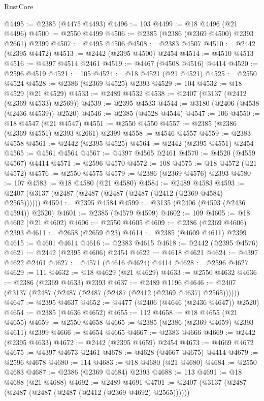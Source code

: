 \begin{lexlean}{RustCore}
\begin{coremodule}
@4495 := @2385 (@4475 @4493)
@4496 := 103
@4499 := @18 @4496 (@21 @4496)
@4500 := @2550 @4499
@4506 := @2385 (@2386 (@2369 @4500) @2393 @2661) @2399
@4507 := @4495 @4506
@4508 := @2383 @4507
@4510 := @2442 (@2395 @4472)
@4513 := @2442 (@2395 @4500) @2454
@4514 := @4510 @4513
@4516 := @4397 @4514 @2461
@4519 := @4467 (@4508 @4516) @4414
@4520 := @2596 @4519
@4521 := 105
@4524 := @18 @4521 (@21 @4521)
@4525 := @2550 @4524
@4528 := @2386 (@2369 @4525) @2393
@4529 := 104
@4532 := @18 @4529 (@21 @4529)
@4533 := @2489 @4532
@4538 := @2407 (@3137 (@2412 (@2369 @4533) @2569))
@4539 := @2395 @4533
@4544 := @3180 (@2406 (@4538 (@2436 @4539)) @2520)
@4546 := @2385 (@4528 @4544)
@4547 := 106
@4550 := @18 @4547 (@21 @4547)
@4551 := @2550 @4550
@4557 := @2385 (@2386 (@2369 @4551) @2393 @2661) @2399
@4558 := @4546 @4557
@4559 := @2383 @4558
@4561 := @2442 (@2395 @4525)
@4564 := @2442 (@2395 @4551) @2454
@4565 := @4561 @4564
@4567 := @4397 @4565 @2461
@4570 := @4520 (@4559 @4567) @4414
@4571 := @2596 @4570
@4572 := 108
@4575 := @18 @4572 (@21 @4572)
@4576 := @2550 @4575
@4579 := @2386 (@2369 @4576) @2393
@4580 := 107
@4583 := @18 @4580 (@21 @4580)
@4584 := @2489 @4583
@4593 := @2407 (@3137 (@2487 (@2487 (@2487 (@2487 (@2412 (@2369 @4584) @2565))))))
@4594 := @2395 @4584
@4599 := @3135 (@2406 (@4593 (@2436 @4594)) @2520)
@4601 := @2385 (@4579 @4599)
@4602 := 109
@4605 := @18 @4602 (@21 @4602)
@4606 := @2550 @4605
@4609 := @2386 (@2369 @4606) @2393
@4611 := @2658 (@2659 @23)
@4614 := @2385 (@4609 @4611) @2399
@4615 := @4601 @4614
@4616 := @2383 @4615
@4618 := @2442 (@2395 @4576)
@4621 := @2442 (@2395 @4606) @2454
@4622 := @4618 @4621
@4624 := @4397 @4622 @2461
@4627 := @4571 (@4616 @4624) @4414
@4628 := @2596 @4627
@4629 := 111
@4632 := @18 @4629 (@21 @4629)
@4633 := @2550 @4632
@4636 := @2386 (@2369 @4633) @2393
@4637 := @2489 @1196
@4646 := @2407 (@3137 (@2487 (@2487 (@2487 (@2487 (@2412 (@2369 @4637) @2565))))))
@4647 := @2395 @4637
@4652 := @4477 (@2406 (@4646 (@2436 @4647)) @2520)
@4654 := @2385 (@4636 @4652)
@4655 := 112
@4658 := @18 @4655 (@21 @4655)
@4659 := @2550 @4658
@4665 := @2385 (@2386 (@2369 @4659) @2393 @4611) @2399
@4666 := @4654 @4665
@4667 := @2383 @4666
@4669 := @2442 (@2395 @4633)
@4672 := @2442 (@2395 @4659) @2454
@4673 := @4669 @4672
@4675 := @4397 @4673 @2461
@4678 := @4628 (@4667 @4675) @4414
@4679 := @2596 @4678
@4680 := 114
@4683 := @18 @4680 (@21 @4680)
@4684 := @2550 @4683
@4687 := @2386 (@2369 @4684) @2393
@4688 := 113
@4691 := @18 @4688 (@21 @4688)
@4692 := @2489 @4691
@4701 := @2407 (@3137 (@2487 (@2487 (@2487 (@2487 (@2412 (@2369 @4692) @2565))))))

\end{coremodule}
\end{lexlean}
